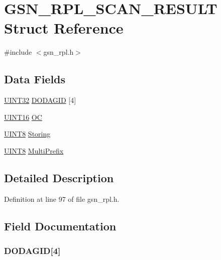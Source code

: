 \hypertarget{a00210}{
\section{GSN\_\-RPL\_\-SCAN\_\-RESULT Struct Reference}
\label{a00210}
}


{\ttfamily \#include $<$gsn\_\-rpl.h$>$}

\subsection*{Data Fields}
\begin{DoxyCompactItemize}
\item 
\hyperlink{a00660_gae1e6edbbc26d6fbc71a90190d0266018}{UINT32} \hyperlink{a00210_a6ec9fb57b7c722be308b1b5672824614}{DODAGID} \mbox{[}4\mbox{]}
\item 
\hyperlink{a00660_ga09f1a1fb2293e33483cc8d44aefb1eb1}{UINT16} \hyperlink{a00210_a9aaa1e0a8619ea489c65aac22afbd4ad}{OC}
\item 
\hyperlink{a00660_gab27e9918b538ce9d8ca692479b375b6a}{UINT8} \hyperlink{a00210_a5dab06a4773811901c55062a9a0de765}{Storing}
\item 
\hyperlink{a00660_gab27e9918b538ce9d8ca692479b375b6a}{UINT8} \hyperlink{a00210_a89b1791cb249ade218357ff49b645164}{MultiPrefix}
\end{DoxyCompactItemize}


\subsection{Detailed Description}


Definition at line 97 of file gsn\_\-rpl.h.



\subsection{Field Documentation}
\hypertarget{a00210_a6ec9fb57b7c722be308b1b5672824614}{
\subsubsection[{DODAGID}]{ {\bf DODAGID}\mbox{[}4\mbox{]}}}
\label{a00210_a6ec9fb57b7c722be308b1b5672824614}


